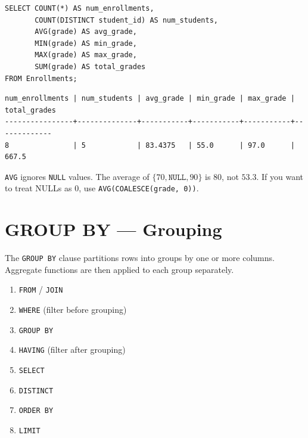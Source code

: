 \begin{codeblock}[title=\textbf{Simple Aggregations}]
\begin{verbatim}
SELECT COUNT(*) AS num_enrollments,
       COUNT(DISTINCT student_id) AS num_students,
       AVG(grade) AS avg_grade,
       MIN(grade) AS min_grade,
       MAX(grade) AS max_grade,
       SUM(grade) AS total_grades
FROM Enrollments;
\end{verbatim}
\end{codeblock}

\begin{codeoutput}
\begin{verbatim}
num_enrollments | num_students | avg_grade | min_grade | max_grade | total_grades
----------------+--------------+-----------+-----------+-----------+-------------
8               | 5            | 83.4375   | 55.0      | 97.0      | 667.5
\end{verbatim}
\end{codeoutput}

\begin{warning}[title=\textbf{AVG and NULL Values}]
\texttt{AVG} ignores \texttt{NULL} values. The average of $\{70, \texttt{NULL}, 90\}$
is $80$, not $53.3$. If you want to treat NULLs as $0$, use
\texttt{AVG(COALESCE(grade, 0))}.
\end{warning}

\section{GROUP BY --- Grouping}

\begin{definition}[GROUP BY]
The \texttt{GROUP BY} clause partitions rows into groups by one or more columns.
Aggregate functions are then applied to each group separately.
\end{definition}

\begin{keyformulas}[title=\textbf{Execution Order with GROUP BY}]
\begin{enumerate}
    \item \texttt{FROM} / \texttt{JOIN}
    \item \texttt{WHERE} (filter before grouping)
    \item \texttt{GROUP BY}
    \item \texttt{HAVING} (filter after grouping)
    \item \texttt{SELECT}
    \item \texttt{DISTINCT}
    \item \texttt{ORDER BY}
    \item \texttt{LIMIT}
\end{enumerate}
\end{keyformulas}

